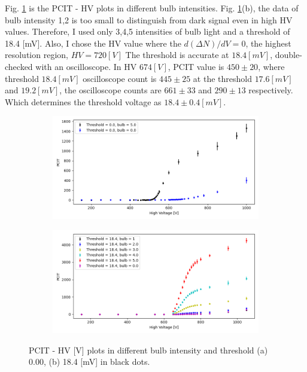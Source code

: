 \documentclass{article}
\begin{document}
Fig. \ref{fig: PMT_boundary} is the PCIT - HV plots in different bulb intensities.
Fig. \ref{fig: PMT_boundary}(b), the data of bulb intensity 1,2 is too small to distinguish from dark signal even in high HV values.
Therefore, I used only 3,4,5 intensities of bulb light and a threshold of 18.4 [mV].
Also, I chose the HV value where the $d(\Delta N)/dV = 0$, the highest resolution region, $HV = 720 [V]$
The threshold is accurate at $18.4 [mV]$, double-checked with an oscilloscope.
In HV $674 [V]$, PCIT value is $450 \pm 20$, where threshold $18.4 [mV]$ oscilloscope count is $445 \pm 25$
at the threshold $17.6 [mV]$ and $19.2 [mV]$, the oscilloscope counts are $661 \pm 33$ and $290 \pm 13$ respectively.
Which determines the threshold voltage as $18.4 \pm 0.4 [mV]$.

\begin{figure}[H]
  \centering
  \begin{subfigure}[b]{10cm}
      \centering
      \includegraphics[width=10cm]{../results/PMT_boundary_(0.0).png}
      \caption{}
  \end{subfigure}
  \hfill
  \begin{subfigure}[b]{10cm}
    \centering
    \includegraphics[width=10cm]{../results/PMT_boundary_(18.4).png}
    \caption{}
\end{subfigure}
\hfill
  \caption{PCIT - HV [V] plots in different bulb intensity and threshold (a) 0.00, (b) 18.4 [mV] in black dots.
  }
  \label{fig: PMT_boundary}
\end{figure}
\end{document}
